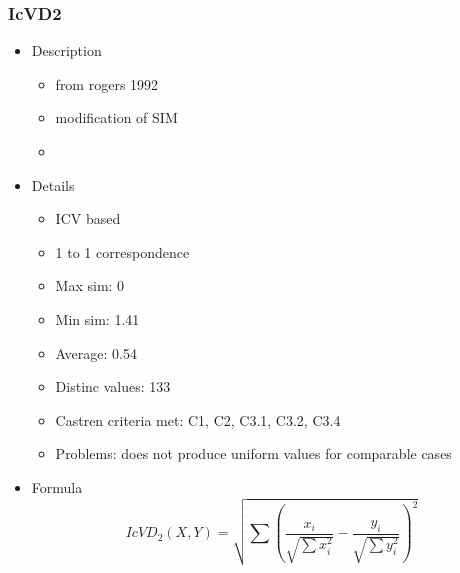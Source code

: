 \documentclass{article}
\begin{document}
\subsubsection{IcVD2}
\label{sec-6-4-2}
\begin{itemize}

\item Description
\label{sec-6-4-2-1}%
\begin{itemize}
\item from rogers 1992
\item modification of SIM
\item 
\end{itemize}

\item Details
\label{sec-6-4-2-2}%
\begin{itemize}
\item ICV based
\item 1 to 1 correspondence
\item Max sim: 0
\item Min sim: 1.41
\item Average: 0.54
\item Distinc values: 133
\item Castren criteria met: C1, C2, C3.1, C3.2, C3.4
\item Problems: does not produce uniform values for comparable cases
\end{itemize}

\item Formula\\
\label{sec-6-4-2-3}%
$$
IcVD_{2}(X,Y)=\sqrt{\sum{\left(\frac{x_{i}}{\sqrt{\sum{x_{i}^{2}}}}-\frac{y_{i}}{\sqrt{\sum{y_{i}^{2}}}}\right)}^{2}}
$$
\end{itemize} %
\end{document}
